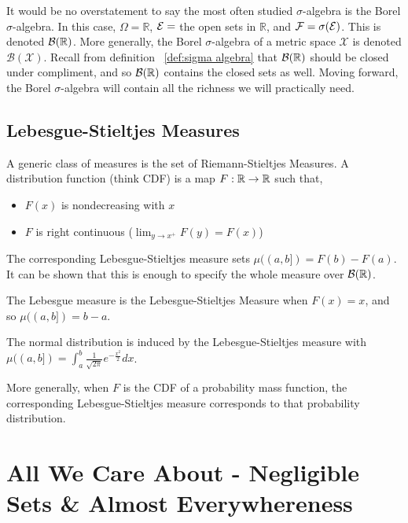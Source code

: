 It would be no overstatement to say the most often studied $\sigma$-algebra is the 
Borel $\sigma$-algebra. In this case, $\Omega = \mathbb R$, $\mathcal E = $ the open sets in 
$\mathbb R$, and $\mathcal F = \sigma(\mathcal E)$. This is denoted $\mathcal B(\mathbb R)$. More generally, the Borel 
$\sigma$-algebra of a metric space $\mathcal X$ is denoted $\mathcal B(\mathcal X)$. 
Recall from definition ~\ref{def:sigma algebra} that $\mathcal B(\mathbb R)$ should be closed under 
compliment, and so $\mathcal B(\mathbb R)$ contains the closed sets as well. Moving forward, 
the Borel $\sigma$-algebra will contain all the richness we will practically need. 


\subsection{Lebesgue-Stieltjes Measures}

A generic class of measures is the set of Riemann-Stieltjes Measures. 
A distribution function (think CDF) is a map $F : \mathbb R \to \mathbb R$ such that, 
\begin{itemize}
    \item $F(x)$ is nondecreasing with $x$
    \item $F$ is right continuous ($\lim_{y \to x^+}F(y) = F(x)$)
\end{itemize}
The corresponding Lebesgue-Stieltjes measure sets $\mu((a,b]) = F(b) - F(a)$. 
It can be shown that this is enough to specify the whole measure over $\mathcal B(\mathbb R)$. 

\begin{example}
The Lebesgue measure is the Lebesgue-Stieltjes Measure when $F(x) = x$, and so 
$\mu((a,b]) = b-a$. 
\end{example}

\begin{example}
    The normal distribution is induced by the Lebesgue-Stieltjes measure with 
    $\mu((a,b]) = \int_a^b \frac{1}{\sqrt{2\pi}}e^{-\frac{x^2}{2}}dx$.
\end{example}

\begin{example}
    More generally, when $F$ is the CDF of a probability mass function, the corresponding 
    Lebesgue-Stieltjes measure corresponds to that probability distribution.
\end{example}

\section{All We Care About - Negligible Sets \& Almost Everywhereness}

